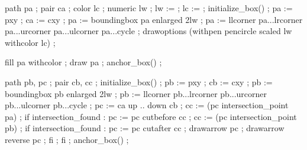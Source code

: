 




  path pa ; pair ca ; color lc ; numeric lw ;
  lw :=  ;
  lc :=  ;
  initialize_box() ;
  pa := pxy ; ca := cxy ; pa := boundingbox pa enlarged 2lw ;
  pa := llcorner pa...lrcorner pa...urcorner pa...ulcorner pa...cycle ;
  drawoptions (withpen pencircle scaled lw withcolor lc) ;
\stopuseMPgraphic

  fill pa withcolor  ; draw pa ;
  anchor_box() ;
\stopMPpositiongraphic

  path pb, pc ; pair cb, cc ;
  initialize_box() ;
  pb := pxy ; cb := cxy ; pb := boundingbox pb enlarged 2lw ;
  pb := llcorner pb...lrcorner pb...urcorner pb...ulcorner pb...cycle ;
  pc := ca {up} .. {down} cb ;
  cc := (pc intersection_point pa) ;
  if intersection_found :
    pc := pc cutbefore cc ;
    cc := (pc intersection_point pb) ;
    if intersection_found :
      pc := pc cutafter cc ;
      drawarrow pc ; drawarrow reverse pc ;
    fi ;
  fi ;
  anchor_box() ;
\stopMPpositiongraphic


